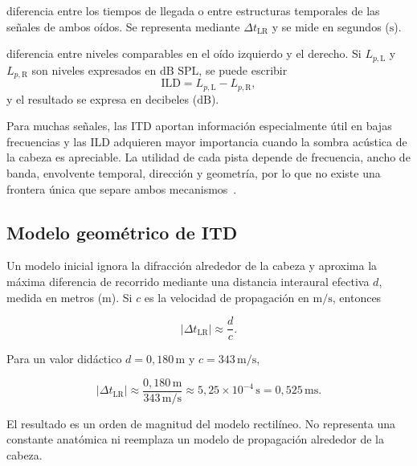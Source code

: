 \begin{description}[style=nextline]
    \item[\textbf{Diferencia interaural de tiempo (ITD):}]
    diferencia entre los tiempos de llegada o entre estructuras temporales de
    las señales de ambos oídos. Se representa mediante
    \(\Delta t_\mathrm{LR}\) y se mide en segundos (\(\text{s}\)).

    \item[\textbf{Diferencia interaural de nivel (ILD):}]
    diferencia entre niveles comparables en el oído izquierdo y el derecho.
    Si \(L_{p,\mathrm{L}}\) y \(L_{p,\mathrm{R}}\) son niveles expresados en
    \(\text{dB SPL}\), se puede escribir
    \[
        \mathrm{ILD}=L_{p,\mathrm{L}}-L_{p,\mathrm{R}},
    \]
    y el resultado se expresa en decibeles (\(\text{dB}\)).
\end{description}

Para muchas señales, las ITD aportan información especialmente útil
en bajas frecuencias y las ILD adquieren mayor importancia cuando la sombra
acústica de la cabeza es apreciable. La utilidad de cada pista depende de
frecuencia, ancho de banda, envolvente temporal, dirección y geometría, por lo
que no existe una frontera única que separe ambos mecanismos~\cite{carlini2024}.

\subsection{Modelo geométrico de ITD}
\label{sec:u7-modelo-itd}

Un modelo inicial ignora la difracción alrededor de la cabeza y aproxima la
máxima diferencia de recorrido mediante una distancia interaural efectiva
\(d\), medida en metros (\(\text{m}\)). Si \(c\) es la velocidad de
propagación en \(\text{m}/\text{s}\), entonces

\begin{equation}
    \lvert\Delta t_\mathrm{LR}\rvert
      \approx\frac{d}{c}.
    \label{eq:u7-itd-geometrica}
\end{equation}

Para un valor didáctico \(d=0{,}180\,\text{m}\) y
\(c=343\,\text{m}/\text{s}\),

\[
    \lvert\Delta t_\mathrm{LR}\rvert
      \approx\frac{0{,}180\,\text{m}}{343\,\text{m}/\text{s}}
      \approx5{,}25\times10^{-4}\,\text{s}
      =0{,}525\,\text{ms}.
\]

El resultado es un orden de magnitud del modelo rectilíneo. No representa una
constante anatómica ni reemplaza un modelo de propagación alrededor de la
cabeza.

